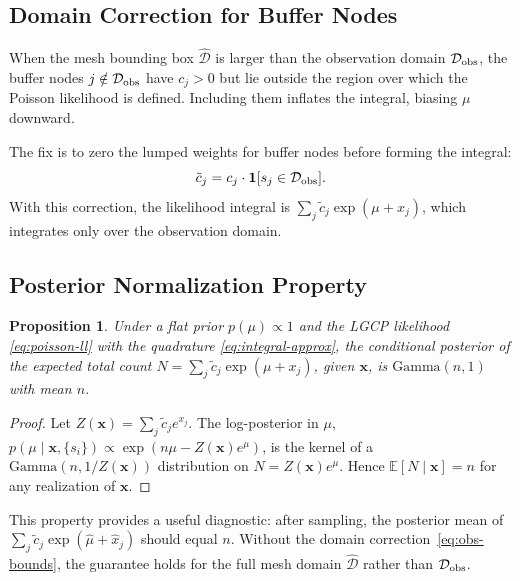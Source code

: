 \documentclass[11pt]{article}
\newtheorem{proposition}{Proposition}
\newcommand{\E}{\mathbb{E}}
\newcommand{\bx}{\mathbf{x}}
\begin{document}
\subsection{Domain Correction for Buffer Nodes}
\label{sec:obs-bounds}

When the mesh bounding box $\hat{\mathcal{D}}$ is larger than the observation
domain $\mathcal{D}_{\rm obs}$, the buffer nodes $j \notin \mathcal{D}_{\rm obs}$
have $c_j > 0$ but lie outside the region over which the Poisson likelihood is
defined.  Including them inflates the integral, biasing $\mu$ downward.

The fix is to zero the lumped weights for buffer nodes before forming the integral:
\begin{equation}
  \tilde{c}_j = c_j \cdot \mathbf{1}[s_j \in \mathcal{D}_{\rm obs}].
  \label{eq:obs-bounds}
\end{equation}
With this correction, the likelihood integral is $\sum_j \tilde{c}_j \exp(\mu+x_j)$,
which integrates only over the observation domain.

\subsection{Posterior Normalization Property}
\label{sec:gamma-posterior}

\begin{proposition}
Under a flat prior $p(\mu) \propto 1$ and the LGCP likelihood \eqref{eq:poisson-ll}
with the quadrature \eqref{eq:integral-approx}, the conditional posterior of the
expected total count $N = \sum_j \tilde{c}_j \exp(\mu + x_j)$, given $\bx$, is
$\mathrm{Gamma}(n, 1)$ with mean $n$.
\end{proposition}

\begin{proof}
Let $Z(\bx) = \sum_j \tilde{c}_j e^{x_j}$.  The log-posterior in $\mu$,
$p(\mu \mid \bx, \{s_i\}) \propto \exp(n\mu - Z(\bx) e^\mu)$,
is the kernel of a $\mathrm{Gamma}(n, 1/Z(\bx))$ distribution on
$N = Z(\bx)e^\mu$.  Hence $\E[N \mid \bx] = n$ for any realization of
$\bx$.
\end{proof}

This property provides a useful diagnostic: after sampling, the posterior mean
of $\sum_j \tilde{c}_j \exp(\hat\mu + \hat x_j)$ should equal $n$.  Without
the domain correction~\eqref{eq:obs-bounds}, the guarantee holds for the full
mesh domain $\hat{\mathcal{D}}$ rather than $\mathcal{D}_{\rm obs}$.

\end{document}
